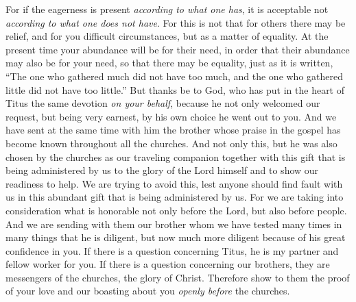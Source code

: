 \begin{biblechapter}
\verse For if the eagerness is present \textit{according to what one has}, it is acceptable not \textit{according to what one does not have}.
\verse For this is not that for others there may be relief, and for you difficult circumstances, but as a matter of equality.
\verse At the present time your abundance will be for their need, in order that their abundance may also be for your need, so that there may be equality,
\verse just as it is written, “The one who gathered much did not have too much, and the one who gathered little did not have too little.”
 But thanks be to God, who has put in the heart of Titus the same devotion \textit{on your behalf},
\verse because he not only welcomed our request, but being very earnest, by his own choice he went out to you.
\verse And we have sent at the same time with him the brother whose praise in the gospel has become known throughout all the churches.
\verse And not only this, but he was also chosen by the churches as our traveling companion together with this gift that is being administered by us to the glory of the Lord himself and to show our readiness to help.
\verse We are trying to avoid this, lest anyone should find fault with us in this abundant gift that is being administered by us.
\verse For we are taking into consideration what is honorable not only before the Lord, but also before people.
\verse And we are sending with them our brother whom we have tested many times in many things that he is diligent, but now much more diligent because of his great confidence in you.
\verse If there is a question concerning Titus, he is my partner and fellow worker for you. If there is a question concerning our brothers, they are messengers of the churches, the glory of Christ.
\verse Therefore show to them the proof of your love and our boasting about you \textit{openly before} the churches.
\end{biblechapter}

